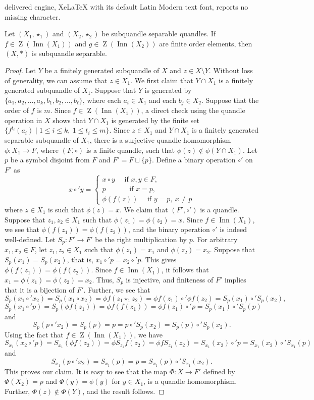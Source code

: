 \documentclass[10pt,a4paper]{amsart}
\newcommand{\Inn}{\operatorname{Inn}}
\newcommand{\Z}{\operatorname{Z}}
\begin{document}
delivered engine, XeLaTeX with its default Latin Modern text font, reports no missing character.
\begin{prop}\label{twisted union subquandle sep}
Let $(X_1,\star_1)$ and $(X_2,\star_2)$ be subquandle separable quandles. If $f\in \Z(\Inn(X_1))$ and $g\in \Z(\Inn(X_2))$ are finite order elements, then $(X,\ast)$ is subquandle separable.
\end{prop}

\begin{proof}
Let $Y$ be a  finitely generated subquandle of $X$ and $z\in X\setminus Y$. Without loss of generality, we can assume that $z\in X_1$. We first claim that $Y\cap X_1$ is a finitely generated subquandle of $X_1$. Suppose that $Y$ is generated by $\{a_1,a_2,\ldots,a_k,b_1,b_2,\ldots,b_\ell\}$, where each $a_i\in X_1$ and each $b_j\in X_2$. Suppose that the order of $f$ is $m$. Since $f\in \Z(\Inn(X_1))$, a direct check using the quandle operation in $X$ shows that $Y\cap X_1$ is generated by the finite set $\{f^{t_i}(a_i)\mid 1\leq i\leq k, ~ 1\leq t_i\leq m\}$.  Since $z\in X_1$ and $Y\cap X_1$ is a finitely generated separable subquandle of $X_1$,  there is a surjective quandle homomorphism $\phi:X_1\to F$, where $(F,\circ)$ is a finite quandle, such that $\phi(z)\notin \phi(Y\cap X_1)$. Let $p$ be a symbol disjoint from $F$ and $F'=F\sqcup\{p\}$. Define a binary operation $\circ'$ on $F'$ as 
$$x\circ' y=\begin{cases}
			x\circ y \quad\text{ if } x,y\in F,\\
			p   \quad\quad\quad\text{ if } x=p,\\
			\phi(f(z)) \quad\text{ if } y=p,~x \ne p
		\end{cases}$$
where $z \in X_1$ is such that $\phi(z)=x$. We claim that $(F',\circ')$ is a quandle. Suppose that $z_1, z_2 \in X_1$ such that $\phi(z_1)=\phi(z_2)=x$. Since $f \in \Inn(X_1)$,
we see that  $\phi(f(z_1))= \phi(f(z_2))$, and the binary operation $\circ'$ is indeed well-defined. Let $S_p: F' \to F'$ be the right multiplication by $p$. For arbitrary $x_1, x_2 \in F$, let $z_1, z_2 \in X_1$ such that $\phi(z_1)=x_1$ and  $\phi(z_2)=x_2$.  Suppose that $S_p(x_1)=S_p(x_2)$, that is, $x_1 \circ' p= x_2 \circ' p$. This gives $\phi(f(z_1))= \phi(f(z_2))$. Since $f \in \Inn(X_1)$, it follows that $x_1=\phi(z_1)=\phi(z_2)=x_2$. Thus, $S_p$ is injective, and finiteness of $F'$ implies that it is a bijection of $F'$. Further, we see that 
$$S_p(x_1 \circ' x_2)= S_p(x_1 \circ x_2)= \phi f (z_1 \star_1 z_2) =\phi f(z_1) \circ' \phi f(z_2) = S_p(x_1) \circ' S_p(x_2),$$
$$S_p(x_1 \circ' p)= S_p(\phi f(z_1))= \phi f(f(z_1)) =\phi f(z_1) \circ' p = S_p(x_1) \circ' S_p(p)$$
and
$$S_p(p \circ' x_2)= S_p(p)=p =p \circ' S_p(x_2) = S_p(p) \circ' S_p(x_2).$$
Using the fact that $f \in \Z(\Inn(X_1))$, we have
$$S_{x_1}(x_2 \circ' p)= S_{x_1}(\phi f (z_2))=\phi S_{z_1} f(z_2)=\phi f S_{z_1}(z_2) = S_{x_1}(x_2) \circ' p = S_{x_1}(x_2) \circ' S_{x_1}(p)$$
and
$$S_{x_1}(p \circ' x_2)= S_{x_1}(p)=p= S_{x_1}(p) \circ' S_{x_1}(x_2).$$
This proves our claim. It is easy to see that the map $\Phi:X\to F'$ defined by $\Phi(X_2)=p$ and $\Phi(y)=\phi(y)$ for $y\in X_1$,  is a quandle homomorphism. Further, $\Phi(z)\notin \Phi(Y)$, and the result follows.
\end{proof}
\end{document}
